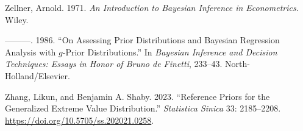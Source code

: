 \documentclass[
  11pt,
  letterpaper,
]{scrbook}
\newlength{\cslhangindent}
\newenvironment{CSLReferences}[2] %
 {\begin{list}{}{%
  \setlength{\itemindent}{0pt}
  \setlength{\leftmargin}{0pt}
  \setlength{\parsep}{0pt}
  \ifodd #1
   \setlength{\leftmargin}{\cslhangindent}
   \setlength{\itemindent}{-1\cslhangindent}
  \fi
  \setlength{\itemsep}{#2\baselineskip}}}
 {\end{list}}
\theoremstyle{plain}
\theoremstyle{plain}
\theoremstyle{plain}
\theoremstyle{definition}
\theoremstyle{definition}
\theoremstyle{definition}
\theoremstyle{remark}
\begin{document}
\begin{CSLReferences}{1}{0}
Zellner, Arnold. 1971. \emph{An Introduction to {B}ayesian Inference in
Econometrics}. Wiley.

---------. 1986. {``On Assessing Prior Distributions and {B}ayesian
Regression Analysis with \(g\)-Prior Distributions.''} In
\emph{{B}ayesian Inference and Decision Techniques: Essays in Honor of
{B}runo de {F}inetti}, 233--43. North-Holland/Elsevier.

Zhang, Likun, and Benjamin A. Shaby. 2023. {``Reference Priors for the
Generalized Extreme Value Distribution.''} \emph{Statistica Sinica} 33:
2185--2208. \url{https://doi.org/10.5705/ss.202021.0258}.

\end{CSLReferences}


\backmatter
\end{document}
